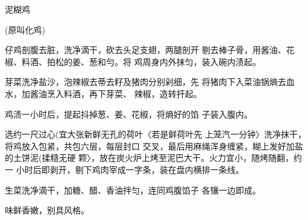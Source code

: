 \begin{recipe}{泥糊鸡}

(原叫化鸡)

\ingredients




\cooking

\step 	仔鸡剖腹去脏，洗净滴干，砍去头足支翅，两腿剖开 剔去棒子骨，用酱油、花椒、料酒、拍松的姜、葱和勻。将 鸡周身内外抹匀，装入碗内渍起。

\step 	芽菜洗净盐沙，泡辣椒去蒂去籽及猪肉分别剁细，先 将猪肉下入菜油锅熵去血水，加酱油烹入料酒，再下芽菜、 辣椒，造转扞起。

\step 	鸡渍一小时后，提起抖掉葱、姜、花椒，将熵好的馅 子装入腹内。

\step 	选约一尺过心(宜大张新鲜无孔的荷叶〈若是鲜荷叶先 上笼汽一分钟〉洗净抹干，将鸡放入包紧，共包六层，每层封口 交叉，最后用麻绳浑身缠紧，糊上发好加盐的土饼泥(揉糙无硬 颗〉，放在炭火炉上烤至泥巴大干。火力宜小，随烤随翻，约一 小时后即剥开，剔下鸡肉宰成一字条，装在盘内横排一条线。

\step 生菜洗净滴干，加糖、醋、香油拌匀，连同鸡腹馅子 各镶一边即成。

\notes

味鲜香嫩，别具风格。

\end{recipe}

